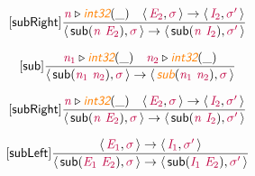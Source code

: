 \documentclass[10pt,leqno,fleqn]{article}
\newcommand{\artVariable}[1]{\mbox{\color{purple}\em #1\/}}
\newcommand{\artConstructor}[1]{\mbox{\sf #1}}
\newcommand{\artSpecial}[1]{\mbox{\color{orange}\sf\em #1}}
\begin{document}
\begin{equation}
\tag*{[\artConstructor{\sf subRight}]}
\begin{split}\frac{ \artVariable{n}\triangleright \artSpecial{int32}(\_) \quad \langle\, \artVariable{E$_{2}$}, \artVariable{$\sigma$}\,\rangle \rightarrow \langle\, \artVariable{I$_{2}$}, \artVariable{$\sigma$\/$^\prime$}\,\rangle }{\langle\, \artConstructor{\sf sub}(\artVariable{n}\ \artVariable{E$_{2}$}), \artVariable{$\sigma$}\,\rangle \rightarrow \langle\, \artConstructor{\sf sub}(\artVariable{n}\ \artVariable{I$_{2}$}), \artVariable{$\sigma$\/$^\prime$}\,\rangle }
\end{split}
\end{equation}

\begin{equation}
\tag*{[\artConstructor{\sf sub}]}
\begin{split}\frac{ \artVariable{n$_{1}$}\triangleright \artSpecial{int32}(\_) \quad  \artVariable{n$_{2}$}\triangleright \artSpecial{int32}(\_) }{\langle\, \artConstructor{\sf sub}(\artVariable{n$_{1}$}\ \artVariable{n$_{2}$}), \artVariable{$\sigma$}\,\rangle \rightarrow \langle\, \artSpecial{sub}(\artVariable{n$_{1}$}\ \artVariable{n$_{2}$}), \artVariable{$\sigma$}\,\rangle }
\end{split}
\end{equation}

\begin{equation}
\tag*{[\artConstructor{\sf subRight}]}
\begin{split}\frac{ \artVariable{n}\triangleright \artSpecial{int32}(\_) \quad \langle\, \artVariable{E$_{2}$}, \artVariable{$\sigma$}\,\rangle \rightarrow \langle\, \artVariable{I$_{2}$}, \artVariable{$\sigma$\/$^\prime$}\,\rangle }{\langle\, \artConstructor{\sf sub}(\artVariable{n}\ \artVariable{E$_{2}$}), \artVariable{$\sigma$}\,\rangle \rightarrow \langle\, \artConstructor{\sf sub}(\artVariable{n}\ \artVariable{I$_{2}$}), \artVariable{$\sigma$\/$^\prime$}\,\rangle }
\end{split}
\end{equation}

\begin{equation}
\tag*{[\artConstructor{\sf subLeft}]}
\begin{split}\frac{\langle\, \artVariable{E$_{1}$}, \artVariable{$\sigma$}\,\rangle \rightarrow \langle\, \artVariable{I$_{1}$}, \artVariable{$\sigma$\/$^\prime$}\,\rangle }{\langle\, \artConstructor{\sf sub}(\artVariable{E$_{1}$}\ \artVariable{E$_{2}$}), \artVariable{$\sigma$}\,\rangle \rightarrow \langle\, \artConstructor{\sf sub}(\artVariable{I$_{1}$}\ \artVariable{E$_{2}$}), \artVariable{$\sigma$\/$^\prime$}\,\rangle }
\end{split}
\end{equation}
\end{document}
